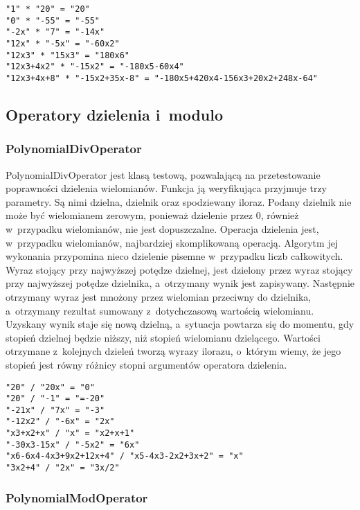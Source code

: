 \begin{lstlisting}
"1" * "20" = "20"
"0" * "-55" = "-55"
"-2x" * "7" = "-14x"
"12x" * "-5x" = "-60x2"
"12x3" * "15x3" = "180x6"
"12x3+4x2" * "-15x2" = "-180x5-60x4"
"12x3+4x+8" * "-15x2+35x-8" = "-180x5+420x4-156x3+20x2+248x-64"
\end{lstlisting}

\subsection{Operatory dzielenia i~modulo}

\subsubsection{PolynomialDivOperator}

PolynomialDivOperator jest klasą testową, pozwalającą na przetestowanie poprawności dzielenia wielomianów. Funkcja ją weryfikująca przyjmuje trzy parametry. Są nimi dzielna, dzielnik oraz spodziewany iloraz. Podany dzielnik nie może być wielomianem zerowym, ponieważ dzielenie przez $0$, również w~przypadku wielomianów, nie jest dopuszczalne. Operacja dzielenia jest, w~przypadku wielomianów, najbardziej skomplikowaną operacją. Algorytm jej wykonania przypomina nieco dzielenie pisemne w~przypadku liczb całkowitych. Wyraz stojący przy najwyższej potędze dzielnej, jest dzielony przez wyraz stojący przy najwyższej potędze dzielnika, a~otrzymany wynik jest zapisywany. Następnie otrzymany wyraz jest mnożony przez wielomian przeciwny do dzielnika, a~otrzymany rezultat sumowany z~dotychczasową wartością wielomianu. Uzyskany wynik staje się nową dzielną, a~sytuacja powtarza się do momentu, gdy stopień dzielnej będzie niższy, niż stopień wielomianu dzielącego. Wartości otrzymane z~kolejnych dzieleń tworzą wyrazy ilorazu, o~którym wiemy, że jego stopień jest równy różnicy stopni argumentów operatora dzielenia.

\begin{lstlisting}
"20" / "20x" = "0"
"20" / "-1" = "=-20"
"-21x" / "7x" = "-3"
"-12x2" / "-6x" = "2x"
"x3+x2+x" / "x" = "x2+x+1"
"-30x3-15x" / "-5x2" = "6x"
"x6-6x4-4x3+9x2+12x+4" / "x5-4x3-2x2+3x+2" = "x"
"3x2+4" / "2x" = "3x/2"
\end{lstlisting}

\subsubsection{PolynomialModOperator}


